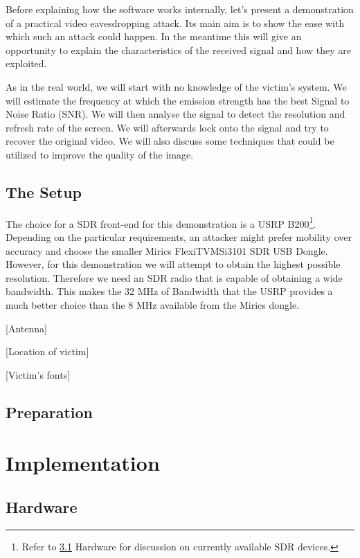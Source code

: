 \documentclass[a4paper,12pt,twoside,openright]{report}
\begin{document}
Before explaining how the software works internally, let's present a demonstration of a practical video eavesdropping attack. Its main aim is to show the ease with which such an attack could happen. In the meantime this will give an opportunity to explain the characteristics of the received signal and how they are exploited.

As in the real world, we will start with no knowledge of the victim's system. We will estimate the frequency at which the emission strength has the best Signal to Noise Ratio (SNR). We will then analyse the signal to detect the resolution and refresh rate of the screen. We will afterwards lock onto the signal and try to recover the original video. We will also discuss some techniques that could be utilized to improve the quality of the image.

\section{The Setup}

The choice for a SDR front-end for this demonstration is a USRP B200\footnote{Refer to \ref{sec:hw} Hardware for discussion on currently available SDR devices.}. Depending on the particular requirements, an attacker might prefer mobility over accuracy and choose the smaller Mirics FlexiTV\texttrademark MSi3101 SDR USB Dongle. However, for this demonstration we will attempt to obtain the highest possible resolution. Therefore we need an SDR radio that is capable of obtaining a wide bandwidth. This makes the 32 MHz of Bandwidth that the USRP provides a much better choice than the 8 MHz available from the Mirics dongle.

[Antenna]

[Location of victim]

[Victim's fonts]

\section{Preparation}

\chapter{Implementation} 

\section{Hardware}
\label{sec:hw} 
\end{document}
